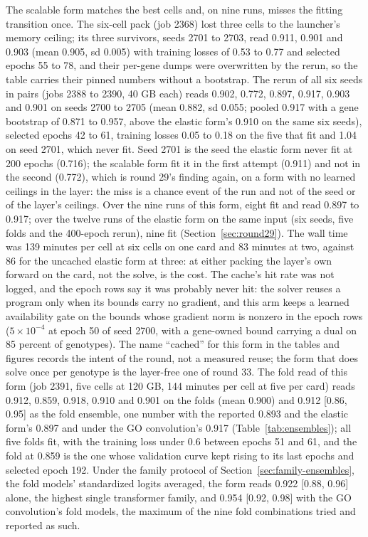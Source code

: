 The scalable form matches the best cells and, on nine runs, misses the fitting
transition once. The six-cell pack (job 2368) lost three cells to the launcher's memory
ceiling; its three survivors, seeds 2701 to 2703, read 0.911, 0.901 and 0.903 (mean
0.905, sd 0.005) with training losses of 0.53 to 0.77 and selected epochs 55 to 78, and
their per-gene dumps were overwritten by the rerun, so the table carries their pinned
numbers without a bootstrap. The rerun of all six seeds in pairs (jobs 2388 to 2390,
40 GB each) reads 0.902, 0.772, 0.897, 0.917, 0.903 and 0.901 on seeds 2700 to 2705
(mean 0.882, sd 0.055; pooled 0.917 with a gene bootstrap of 0.871 to 0.957, above
the elastic form's 0.910 on the same six seeds), selected epochs 42 to 61, training
losses 0.05 to 0.18 on the five that fit and 1.04 on seed 2701, which never fit. Seed
2701 is the seed the elastic form never fit at 200 epochs (0.716); the scalable form
fit it in the first attempt (0.911) and not in the second (0.772), which is round 29's
finding again, on a form with no learned ceilings in the layer: the
miss is a chance event of the run and not of the seed or of the layer's ceilings. Over
the nine runs of this form, eight fit and read 0.897 to 0.917; over the twelve runs of
the elastic form on the same input (six seeds, five folds and the 400-epoch rerun),
nine fit (Section~\ref{sec:round29}). The wall time
was 139 minutes per cell at six cells on one card and 83 minutes at two, against 86
for the uncached elastic form at three: at either packing the layer's own forward on
the card, not the solve, is the cost. The cache's hit rate was not logged, and the
epoch rows say it was probably never hit: the solver reuses a program only when its
bounds carry no gradient, and this arm keeps a learned availability gate on the bounds
whose gradient norm is nonzero in the epoch rows ($5 \times 10^{-4}$ at epoch 50 of seed
2700, with a gene-owned bound carrying a dual on 85 percent of genotypes). The name
``cached'' for this form in the tables and figures records the intent of the round, not a
measured reuse; the form that does solve once per genotype is the layer-free one of
round 33. The
fold read of this form (job 2391, five cells at 120 GB, 144 minutes per cell at five
per card) reads 0.912, 0.859, 0.918, 0.910 and 0.901 on the folds (mean 0.900) and
0.912 [0.86, 0.95] as the fold ensemble, one number with the reported 0.893 and the
elastic form's 0.897 and under the GO convolution's 0.917
(Table~\ref{tab:ensembles}); all five folds fit, with the training loss under 0.6
between epochs 51 and 61, and the fold at 0.859 is the one whose validation curve kept
rising to its last epochs and selected epoch 192. Under the family protocol of
Section~\ref{sec:family-ensembles}, the fold models' standardized logits averaged, the
form reads 0.922 [0.88, 0.96] alone, the highest single transformer family, and 0.954
[0.92, 0.98] with the GO convolution's fold models, the maximum of the nine fold
combinations tried and reported as such.


